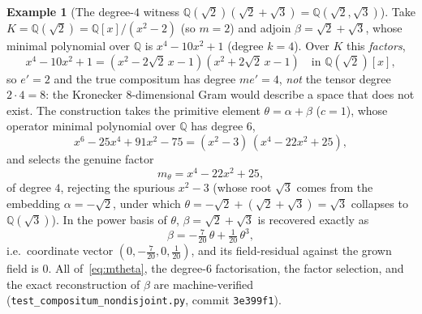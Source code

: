 \documentclass[11pt]{article}
\theoremstyle{plain}
\theoremstyle{definition}
\newtheorem{example}[theorem]{Example}
\theoremstyle{remark}
\newcommand{\Q}{\mathbb{Q}}
\newcommand{\K}{K}
\begin{document}
\begin{example}[The degree-$4$ witness $\Q(\sqrt2)(\sqrt2+\sqrt3)=\Q(\sqrt2,\sqrt3)$]\label{ex:nondisjoint}
Take $\K=\Q(\sqrt2)=\Q[x]/(x^2-2)$ (so $m=2$) and adjoin $\beta=\sqrt2+\sqrt3$, whose minimal polynomial over
$\Q$ is $x^4-10x^2+1$ (degree $k=4$). Over $\K$ this \emph{factors},
\[
  x^4-10x^2+1=(x^2-2\sqrt2\,x-1)(x^2+2\sqrt2\,x-1)\quad\text{in }\Q(\sqrt2)[x],
\]
so $e'=2$ and the true compositum has degree $m e'=4$, \emph{not} the tensor degree $2\cdot4=8$: the Kronecker
$8$-dimensional Gram would describe a space that does not exist. The construction takes the primitive element
$\theta=\alpha+\beta$ ($c=1$), whose operator minimal polynomial over $\Q$ has degree $6$,
\[
  x^6-25x^4+91x^2-75=(x^2-3)\,(x^4-22x^2+25),
\]
and selects the genuine factor
\begin{equation}\label{eq:mtheta}
  m_\theta=x^4-22x^2+25,
\end{equation}
of degree $4$, rejecting the spurious $x^2-3$ (whose root $\sqrt3$ comes from the embedding $\alpha=-\sqrt2$,
under which $\theta=-\sqrt2+(\sqrt2+\sqrt3)=\sqrt3$ collapses to $\Q(\sqrt3)$). In the power basis of $\theta$,
$\beta=\sqrt2+\sqrt3$ is recovered exactly as
\[
  \beta=-\tfrac{7}{20}\,\theta+\tfrac1{20}\,\theta^3,
\]
i.e.\ coordinate vector $(0,-\tfrac7{20},0,\tfrac1{20})$, and its field-residual against the grown field is
$0$. All of~\eqref{eq:mtheta}, the degree-$6$ factorisation, the factor selection, and the exact
reconstruction of $\beta$ are machine-verified (\texttt{test\_compositum\_nondisjoint.py}, commit
\texttt{3e399f1}).
\end{example}
\end{document}

